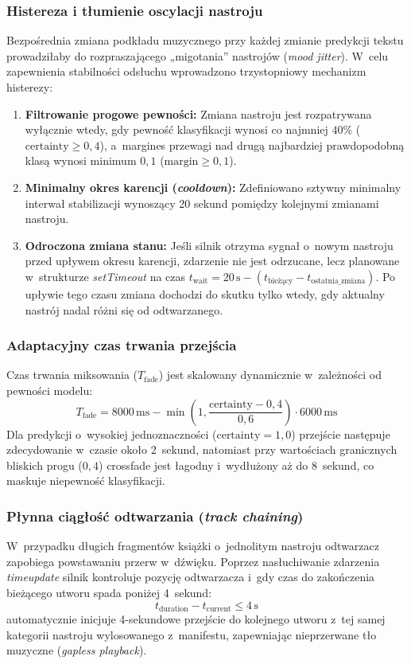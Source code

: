 \subsubsection{Histereza i tłumienie oscylacji nastroju}
Bezpośrednia zmiana podkładu muzycznego przy każdej zmianie predykcji tekstu prowadziłaby do rozpraszającego „migotania” nastrojów (\textit{mood jitter}). W~celu zapewnienia
stabilności odsłuchu wprowadzono trzystopniowy mechanizm histerezy:
\begin{enumerate}
    \item \textbf{Filtrowanie progowe pewności:} Zmiana nastroju jest rozpatrywana wyłącznie wtedy, gdy pewność klasyfikacji wynosi co najmniej $40\%$ ($\text{certainty} \ge 0{,}4$),
    a~margines przewagi nad drugą najbardziej prawdopodobną klasą wynosi minimum $0{,}1$ ($\text{margin} \ge 0{,}1$).
    \item \textbf{Minimalny okres karencji (\textit{cooldown}):} Zdefiniowano sztywny minimalny interwał stabilizacji wynoszący 20 sekund pomiędzy kolejnymi zmianami nastroju.
    \item \textbf{Odroczona zmiana stanu:} Jeśli silnik otrzyma sygnał o~nowym nastroju przed upływem okresu karencji, zdarzenie nie jest odrzucane, lecz planowane w~strukturze
    \textit{setTimeout} na czas $t_{\text{wait}} = 20\,\text{s} - (t_{\text{bieżący}} - t_{\text{ostatnia\_zmiana}})$. Po upływie tego czasu zmiana dochodzi do skutku tylko wtedy, gdy
    aktualny nastrój nadal różni się od odtwarzanego.
\end{enumerate}

\subsubsection{Adaptacyjny czas trwania przejścia}
Czas trwania miksowania ($T_{\text{fade}}$) jest skalowany dynamicznie w~zależności od pewności modelu:
\begin{equation}
    T_{\text{fade}} = 8000\,\text{ms} - \min\left(1, \frac{\text{certainty} - 0{,}4}{0{,}6}\right) \cdot 6000\,\text{ms}
\end{equation}
Dla predykcji o~wysokiej jednoznaczności ($\text{certainty} = 1{,}0$) przejście następuje zdecydowanie w~czasie około 2~sekund, natomiast przy wartościach granicznych bliskich progu
($0{,}4$) crossfade jest łagodny i~wydłużony aż do 8~sekund, co maskuje niepewność klasyfikacji.

\subsubsection{Płynna ciągłość odtwarzania (\textit{track chaining})}
W~przypadku długich fragmentów książki o~jednolitym nastroju odtwarzacz zapobiega powstawaniu przerw w~dźwięku. Poprzez nasłuchiwanie zdarzenia \textit{timeupdate} silnik kontroluje
pozycję odtwarzacza i~gdy czas do zakończenia bieżącego utworu spada poniżej 4~sekund:
\begin{equation}
    t_{\text{duration}} - t_{\text{current}} \le 4\,\text{s}
\end{equation}
automatycznie inicjuje 4-sekundowe przejście do kolejnego utworu z~tej samej kategorii nastroju wylosowanego z~manifestu, zapewniając nieprzerwane tło muzyczne (\textit{gapless
playback}).


